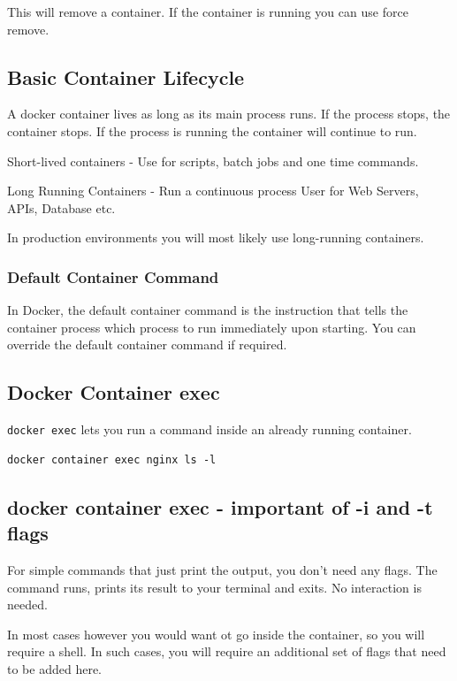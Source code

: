 \documentclass[11pt]{book}
\begin{document}
    This will remove a container. If the container is running you can use force remove.


    \subsection{Basic Container Lifecycle}
    A docker container lives as long as its main process runs.
    If the process stops, the container stops.
    If the process is running the container will continue to run.

    Short-lived containers
    - Use for scripts, batch jobs and one time commands.

    Long Running Containers
    - Run a continuous process
    User for Web Servers, APIs, Database etc.

    In production environments you will most likely use long-running containers.

    \subsubsection{Default Container Command}
    In Docker, the default container command is the instruction that tells the container process which process to run immediately upon starting.
    You can override the default container command if required.

    \subsection{Docker Container exec}
    \texttt{docker exec} lets you run a command inside an already running container.

    \begin{lstlisting}[style=terminal]
        docker container exec nginx ls -l
    \end{lstlisting}

    \subsection{docker container exec - important of -i and -t flags}

    For simple commands that just print the output, you don't need any flags. The command runs, prints its result to your terminal and exits.
    No interaction is needed.

    In most cases however you would want ot go inside the container, so you will require a shell.
    In such cases, you will require an additional set of flags that need to be added here.
\end{document}
